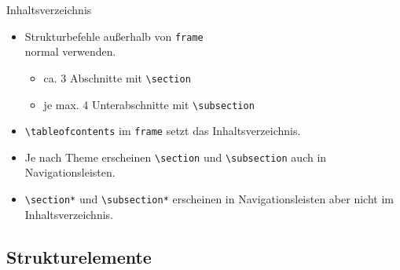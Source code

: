 
\begin{Frame}[fragile]{Inhaltsverzeichnis}
  \begin{itemize}
    \item Strukturbefehle außerhalb von \lstinline-frame-\\
      normal verwenden.
      \begin{itemize}
        \item ca. 3 Abschnitte mit \lstinline-\section-
        \item je max. 4 Unterabschnitte mit \lstinline-\subsection-
      \end{itemize}
    \item \lstinline-\tableofcontents- im \lstinline-frame- setzt das Inhaltsverzeichnis.
    \item Je nach Theme erscheinen \lstinline-\section- und
      \lstinline-\subsection- auch in Navigationsleisten.
    \item \lstinline-\section*- und \lstinline-\subsection*- erscheinen in
      Navigationsleisten aber nicht im Inhaltsverzeichnis.
  \end{itemize}
\end{Frame}

\subsection{Strukturelemente}


